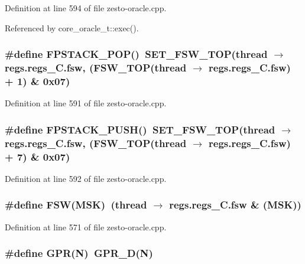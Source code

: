 Definition at line 594 of file zesto-oracle.cpp.

Referenced by core\_\-oracle\_\-t::exec().
\subsubsection[{FPSTACK\_\-POP}]{\setlength{\rightskip}{0pt plus 5cm}\#define FPSTACK\_\-POP()~SET\_\-FSW\_\-TOP(thread $\rightarrow$ regs.regs\_\-C.fsw, (FSW\_\-TOP(thread $\rightarrow$ regs.regs\_\-C.fsw) + 1) \& 0x07)}\label{zesto-oracle_8cpp_327a614a72ecd9c0b62884060a1bb259}




Definition at line 591 of file zesto-oracle.cpp.
\subsubsection[{FPSTACK\_\-PUSH}]{\setlength{\rightskip}{0pt plus 5cm}\#define FPSTACK\_\-PUSH()~SET\_\-FSW\_\-TOP(thread $\rightarrow$ regs.regs\_\-C.fsw, (FSW\_\-TOP(thread $\rightarrow$ regs.regs\_\-C.fsw) + 7) \& 0x07)}\label{zesto-oracle_8cpp_33f3b84a911da7e5f45c0ef7c72d2cd1}




Definition at line 592 of file zesto-oracle.cpp.
\subsubsection[{FSW}]{\setlength{\rightskip}{0pt plus 5cm}\#define FSW(MSK)~(thread $\rightarrow$ regs.regs\_\-C.fsw \& (MSK))}\label{zesto-oracle_8cpp_1a0c942425e8394d87a1262793048912}




Definition at line 571 of file zesto-oracle.cpp.
\subsubsection[{GPR}]{\setlength{\rightskip}{0pt plus 5cm}\#define GPR(N)~GPR\_\-D(N)}\label{zesto-oracle_8cpp_33a09842f2467a215179ba1c4e09653f}




